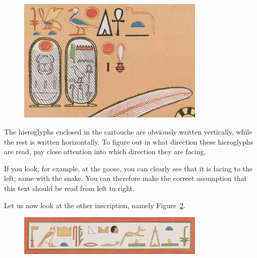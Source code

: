 \documentclass[a5paper,twoside,11pt]{report}
\begin{document}
		\begin{figure}
			\centering
			\includegraphics[width=0.8\textwidth]{images/img1.jpg}
			\caption{\cite{NYC:Ernst_1}}
			\label{fig:1}
		\end{figure}

		The hieroglyphs enclosed in the cartouche are obviously written vertically, while the rest is written horizontally. To figure out in what direction these hieroglyphs are read, pay close attention into which direction they are facing. 

		If you look, for example, at the goose, you can clearly see that it is facing to the left; same with the snake. You can therefore make the correct assumption that this text should be read from left to right. 

		Let us now look at the other inscription, namely Figure~\ref{fig:2}.

		\begin{figure}
			\centering
			\includegraphics[width=0.8\textwidth]{images/img2.jpg}
			\caption{\cite{NYC:Ernst_Grab54}}
			\label{fig:2}
		\end{figure}
\end{document}
